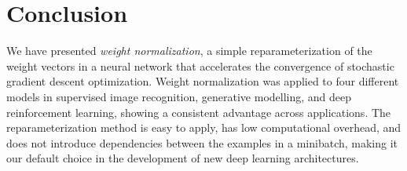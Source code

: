 \documentclass{article}
\newcommand{\bv}{\mathbf{v}}
\begin{document}


\section{Conclusion}
\label{sec:conclusion}
We have presented \emph{weight normalization}, a simple reparameterization of the weight vectors in a neural network that accelerates the convergence of stochastic gradient descent optimization. Weight normalization was applied to four different models in supervised image recognition, generative modelling, and deep reinforcement learning, showing a consistent advantage across applications. The reparameterization method is easy to apply, has low computational overhead, and does not introduce dependencies between the examples in a minibatch, making it our default choice in the development of new deep learning architectures.
\end{document}
